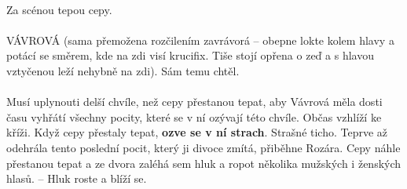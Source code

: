 \documentclass[10pt,a4paper]{article}
\newcommand{\n}[1]{\marginnote{\hspace{-0.6\textwidth}#1}}
\begin{document}
 \\
Za scénou tepou cepy.\\
 \\
VÁVROVÁ (sama přemožena rozčilením zavrávorá – obepne lokte kolem hlavy a potácí se směrem, kde na zdi visí krucifix. Tiše stojí opřena o zeď a s hlavou vztyčenou leží nehybně na zdi). Sám temu chtěl.\\
  \\
Musí uplynouti delší chvíle, než cepy přestanou tepat, aby Vávrová měla dosti času vyhřátí všechny pocity, které se v ní ozývají této chvíle. Občas vzhlíží ke kříži. Když cepy přestaly tepat, \textbf{ozve se v ní strach}. Strašné ticho. Teprve až odehrála tento poslední pocit, který ji divoce zmítá, přiběhne Rozára. Cepy náhle přestanou tepat a ze dvora zaléhá sem hluk a ropot několika mužských i ženských hlasů. – Hluk roste a blíží se. \n{personifikace}\\
\\
\restoregeometry
\end{document}
